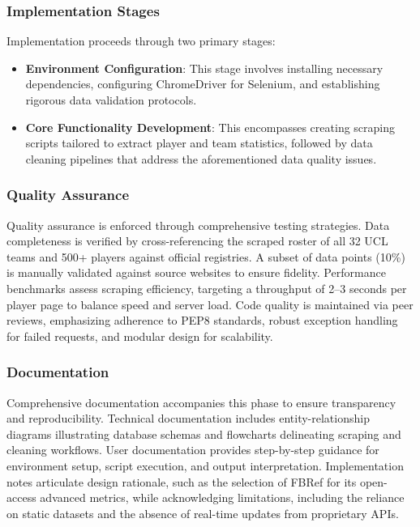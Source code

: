\documentclass[12pt]{article}
\begin{document}
\subsubsection{Implementation Stages}
Implementation proceeds through two primary stages:

\begin{itemize}
    \item \textbf{Environment Configuration}: This stage involves installing necessary dependencies, configuring ChromeDriver for Selenium, and establishing rigorous data validation protocols.
    \item \textbf{Core Functionality Development}: This encompasses creating scraping scripts tailored to extract player and team statistics, followed by data cleaning pipelines that address the aforementioned data quality issues.
\end{itemize}

\subsubsection{Quality Assurance}
Quality assurance is enforced through comprehensive testing strategies. Data completeness is verified by cross-referencing the scraped roster of all 32 UCL teams and 500+ players against official registries. A subset of data points (10\%) is manually validated against source websites to ensure fidelity. Performance benchmarks assess scraping efficiency, targeting a throughput of 2--3 seconds per player page to balance speed and server load. Code quality is maintained via peer reviews, emphasizing adherence to PEP8 standards, robust exception handling for failed requests, and modular design for scalability.

\subsubsection{Documentation}
Comprehensive documentation accompanies this phase to ensure transparency and reproducibility. Technical documentation includes entity-relationship diagrams illustrating database schemas and flowcharts delineating scraping and cleaning workflows. User documentation provides step-by-step guidance for environment setup, script execution, and output interpretation. Implementation notes articulate design rationale, such as the selection of FBRef for its open-access advanced metrics, while acknowledging limitations, including the reliance on static datasets and the absence of real-time updates from proprietary APIs.
\end{document}
